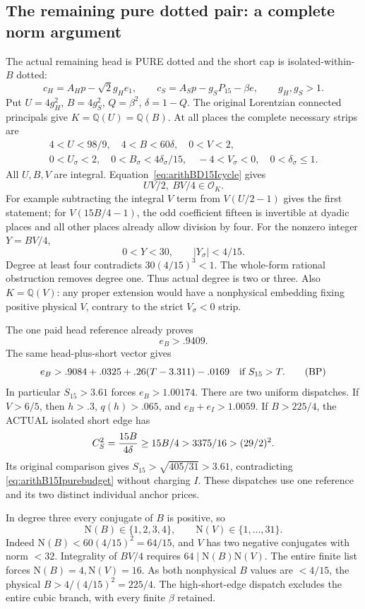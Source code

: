 \subsection{The remaining pure dotted pair: a complete norm argument}
\label{app:arithB15Ipurepair}

The actual remaining head is PURE dotted and the short
cap is isolated-within-\(B\) dotted:
\[
 c_H=A_Hp-\sqrt2g_He_1,\qquad
 c_S=A_Sp-g_SP_{15}-\beta e,\qquad g_H,g_S>1 .
\]
Put \(U=4g_H^2\), \(B=4g_S^2\), \(Q=\beta^2\),
\(\delta=1-Q\).
The original Lorentzian connected principals give
\(K=\mathbb Q(U)=\mathbb Q(B)\).
At all places the complete necessary strips are
\[
 \begin{gathered}
 4<U<98/9,\quad 4<B<60\delta,\quad 0<V<2,\\
 0<U_\sigma<2,\quad
 0<B_\sigma<4\delta_\sigma/15,\quad
 -4<V_\sigma<0,\quad 0<\delta_\sigma\le1 .
 \end{gathered}
\]
All \(U,B,V\) are integral.
Equation~\eqref{eq:arithBD15Icycle} gives
\[
                       UV/2,\ BV/4\in\mathcal O_K.
\]
For example subtracting the integral \(V\) term
from \(V(U/2-1)\) gives the first statement;
for \(V(15B/4-1)\), the odd coefficient fifteen
is invertible at dyadic places and all other
places already allow division by four.
For the nonzero integer \(Y=BV/4\),
\[
             0<Y<30,\qquad |Y_\sigma|<4/15 .
\]
Degree at least four contradicts
\(30(4/15)^3<1\).
The whole-form rational obstruction removes degree one.
Thus actual degree is two or three.
Also \(K=\mathbb Q(V)\): any proper extension would have
a nonphysical embedding fixing positive physical \(V\),
contrary to the strict \(V_\sigma<0\) strip.

The one paid head reference already proves
\[
                         e_B>.9409 .
\]
The same head-plus-short vector gives
\[
                 e_B>.9084+.0325+.26(T-3.311)-.0169
              \quad\hbox{if }S_{15}>T .
\tag{BP}\label{eq:arithB15Ipurebudget}
\]
In particular \(S_{15}>3.61\) forces \(e_B>1.00174\).
There are two uniform dispatches.
If \(V>6/5\), then \(h>.3\), \(q(h)>.065\),
and \(e_B+e_I>1.0059\).
If \(B>225/4\), the ACTUAL isolated short edge has
\[
 C_S^2={15B\over4\delta}\ge15B/4>3375/16>(29/2)^2 .
\]
Its original comparison gives
\(S_{15}>\sqrt{405/31}>3.61\), contradicting
\eqref{eq:arithB15Ipurebudget} without charging \(I\).
These dispatches use one reference and its two distinct
individual anchor prices.

In degree three every conjugate of \(B\) is positive, so
\[
        \mathrm N(B)\in\{1,2,3,4\},\qquad
        \mathrm N(V)\in\{1,\ldots,31\}.
\]
Indeed \(\mathrm N(B)<60(4/15)^2=64/15\),
and \(V\) has two negative conjugates with norm \(<32\).
Integrality of \(BV/4\) requires
\(64\mid\mathrm N(B)\mathrm N(V)\).
The entire finite list forces
\(\mathrm N(B)=4,\mathrm N(V)=16\).
As both nonphysical \(B\) values are \(<4/15\),
the physical \(B>4/(4/15)^2=225/4\).
The high-short-edge dispatch excludes the entire
cubic branch, with every finite \(\beta\) retained.


